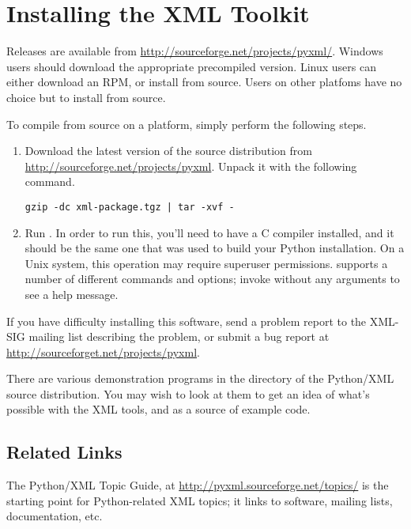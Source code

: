 \documentclass{howto}
\begin{document}
\section{Installing the XML Toolkit\label{section-install}}

Releases are available from
\url{http://sourceforge.net/projects/pyxml/}.
Windows users should download the appropriate precompiled version.
Linux users can either download an RPM, or install from source.  Users
on other platfoms have no choice but to install from source.

To compile from source on a \UNIX{} platform, simply perform the
following steps.

\begin{enumerate}

\item Download the latest version of the source distribution from
\url{http://sourceforge.net/projects/pyxml}.  Unpack it with the
following command.

\begin{verbatim}
gzip -dc xml-package.tgz | tar -xvf -
\end{verbatim}

\item Run .  In order to run this,
you'll need to have a C compiler installed, and it should be the same
one that was used to build your Python installation. On a Unix system,
this operation may require superuser permissions. 
supports a number of different commands and options; invoke
 without any arguments to see a help message.

\end{enumerate}

If you have difficulty installing this software, send a problem report
to the XML-SIG mailing list describing the problem, or submit a bug report
at \url{http://sourceforget.net/projects/pyxml}.

There are various demonstration programs in the  directory
of the Python/XML source distribution.  You may wish to look at them
to get an idea of what's possible with the XML tools, and as a source
of example code.


\subsection{Related Links}

The Python/XML Topic Guide, at
\url{http://pyxml.sourceforge.net/topics/} is the starting point for
Python-related XML topics; it links to software, mailing lists,
documentation, etc.
\end{document}

